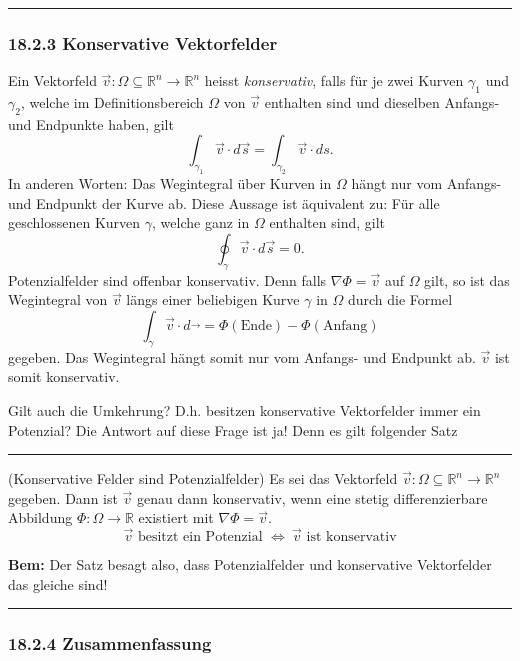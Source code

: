 \documentclass[a4paper,landscape,8pt]{extarticle}
\newcommand{\R}{\mathbb{R}}
\newcommand{\sep}{\vspace{5pt}\noindent\hrule\vspace{5pt}}
\newcommand{\Bem}{\textbf{Bem: }}
\begin{document}
\begin{multicols*}{4}
\sep

\subsubsection{18.2.3 Konservative Vektorfelder}

Ein Vektorfeld $\vec{v}\colon\Omega\subseteq\R^n\to\R^n$ heisst
\emph{konservativ}, falls für je zwei Kurven $\gamma_1$ und $\gamma_2$, welche
im Definitionsbereich $\Omega$ von $\vec{v}$ enthalten sind und dieselben
Anfangs- und Endpunkte haben, gilt
\[
\int_{\gamma_1} \vec{v}\cdot d\vec{s}
= \int_{\gamma_2} \vec{v}\cdot ds.
\]
In anderen Worten: Das Wegintegral über Kurven in $\Omega$ hängt nur vom
Anfangs- und Endpunkt der Kurve ab. Diese Aussage ist äquivalent zu: Für alle
geschlossenen Kurven $\gamma$, welche ganz in $\Omega$ enthalten sind, gilt
\[
\oint_\gamma \vec{v}\cdot d\vec{s} = 0.
\]
Potenzialfelder sind offenbar konservativ. Denn falls $\nabla\Phi=\vec{v}$ auf
$\Omega$ gilt, so ist das Wegintegral von $\vec{v}$ längs einer beliebigen Kurve
$\gamma$ in $\Omega$ durch die Formel
\[
\int_\gamma \vec{v}\cdot d\vec{} = \Phi(\text{Ende})-\Phi(\text{Anfang})
\]
gegeben. Das Wegintegral hängt somit nur vom Anfangs- und Endpunkt ab. $\vec{v}$
ist somit konservativ.

Gilt auch die Umkehrung? D.h. besitzen konservative Vektorfelder immer ein
Potenzial? Die Antwort auf diese Frage ist ja! Denn es gilt folgender Satz

\sep

\Satz (Konservative Felder sind Potenzialfelder) Es sei das Vektorfeld
$\vec{v}\colon\Omega\subseteq\R^n\to\R^n$ gegeben. Dann ist $\vec{v}$ genau dann
konservativ, wenn eine stetig differenzierbare Abbildung $\Phi\colon\Omega\to\R$
existiert mit $\nabla\Phi = \vec{v}$.
\[
\vec{v} \text{ besitzt ein Potenzial } \Longleftrightarrow
\ \vec{v} \text{ ist konservativ}
\]

\Bem Der Satz besagt also, dass Potenzialfelder und konservative Vektorfelder
das gleiche sind!

\sep

\subsubsection{18.2.4 Zusammenfassung}


\end{multicols*}
\end{document}
